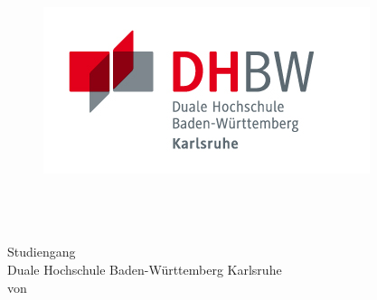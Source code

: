 \thispagestyle{plain}
\begin{titlepage}
\begin{spacing}{1.0}
\enlargethispage{4.0cm}
\sffamily 								%
				
\begin{figure}

\hfill
\begin{minipage}[htbp]{5cm}
	\centering 
	\includegraphics[scale=2.0]{Bilder/logo_dhbw.jpg}

\end{minipage} 
\end{figure}

% 				

\begin{center}

\huge{\textsc{\textbf{\titel}}}\\[1.5ex]
\Large{\textbf{\untertitel}}\\[5ex]
\LARGE{\textbf{\arbeit}}\\[2ex]
\Large{Studiengang \studiengang}\\[1ex]
\normalsize{Duale Hochschule Baden-Württemberg Karlsruhe}\\[5ex]
von\\[1ex] \autor \\[18ex]



\end{center}
\end{spacing}
\end{titlepage}
